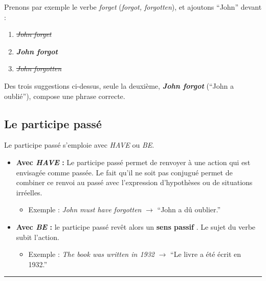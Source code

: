 \documentclass[
  10pt,
]{article}
\providecommand{\tightlist}{%
  \setlength{\itemsep}{0pt}\setlength{\parskip}{0pt}}
\begin{document}
Prenons par exemple le verbe \emph{forget} (\emph{forgot, forgotten}), et ajoutons ``John'' devant :

\begin{enumerate}
\def\labelenumi{\arabic{enumi}.}
\tightlist
\item
  \sout{\color[HTML]{f44336}\emph{John forget} \color{black}}
\item
  \textbf{\color[HTML]{4caf50}\emph{John forgot} \color{black}}
\item
  \sout{\color[HTML]{f44336}\emph{John forgotten} \color{black}}
\end{enumerate}

Des trois suggestions ci-dessus, seule la deuxième, \textbf{\color[HTML]{4caf50}\emph{John forgot} \color{black}} (``John a oublié''), compose une phrase correcte.

\hypertarget{le-participe-passuxe9}{%
\subsection{Le participe passé}\label{le-participe-passuxe9}}

Le participe passé s'emploie avec \emph{HAVE} ou \emph{BE}.

\begin{itemize}
\tightlist
\item
  \textbf{Avec \emph{HAVE} :} Le participe passé permet de renvoyer à une action qui est envisagée comme passée.
  Le fait qu'il ne soit pas conjugué permet de combiner ce renvoi au passé avec l'expression d'hypothèses ou de situations irréelles.

  \begin{itemize}
  \tightlist
  \item
    Exemple : \emph{John must have forgotten} \(\rightarrow\) ``John a dû oublier.''
  \end{itemize}
\item
  \textbf{Avec \emph{BE} :} le participe passé revêt alors un \textbf{\color[HTML]{f44336}sens passif \color{black}}. Le sujet du verbe subit l'action.

  \begin{itemize}
  \tightlist
  \item
    Exemple : \emph{The book was written in 1932} \(\rightarrow\) ``Le livre a été écrit en 1932.''
  \end{itemize}
\end{itemize}

\begin{center}\rule{0.5\linewidth}{0.5pt}\end{center}
\end{document}
